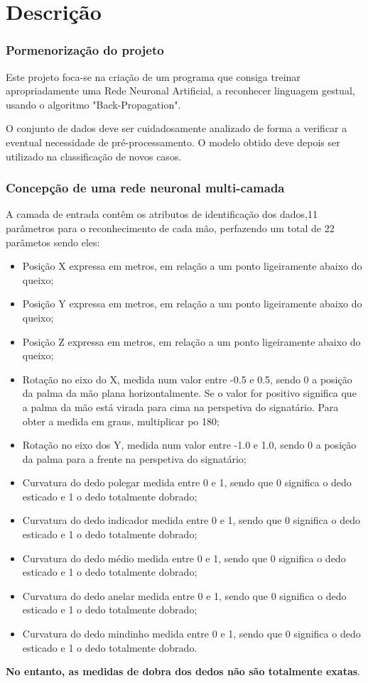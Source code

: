 \documentclass[10pt,a4paper]{article}
\begin{document}
\section{Descrição}

\subsubsection{Pormenorização do projeto}
Este projeto foca-se na criação de um programa que consiga treinar apropriadamente uma Rede Neuronal Artificial, a reconhecer linguagem gestual, usando o algoritmo "Back-Propagation". 

O conjunto de dados deve ser cuidadosamente analizado de forma a verificar a eventual necessidade de pré-processamento. O modelo obtido deve depois ser utilizado na classificação de novos casos. 

\subsubsection{Concepção de uma rede neuronal multi-camada}
A camada de entrada contêm os atributos de identificação dos dados,11 parâmetros para o reconhecimento de cada mão, perfazendo um total de 22 parâmetos sendo eles:
\begin{itemize}
\item Posição X expressa em metros, em relação a um ponto ligeiramente abaixo do queixo;
\item Posição Y expressa em metros, em relação a um ponto ligeiramente abaixo do queixo;
\item Posição Z expressa em metros, em relação a um ponto ligeiramente abaixo do queixo;
\item Rotação no eixo do X, medida num valor entre -0.5 e 0.5, sendo 0 a posição da palma da mão plana horizontalmente. Se o valor for positivo significa que a palma da mão está virada para cima na perspetiva do signatário. Para obter a medida em graus, multiplicar po 180;
\item Rotação no eixo dos Y, medida num valor entre -1.0 e 1.0, sendo 0 a posição da palma para a frente na perspetiva do signatário;
\item Curvatura do dedo polegar medida entre 0 e 1, sendo que 0 significa o dedo esticado e 1 o dedo totalmente dobrado;
\item Curvatura do dedo indicador medida entre 0 e 1, sendo que 0 significa o dedo esticado e 1 o dedo totalmente dobrado;
\item Curvatura do dedo médio medida entre 0 e 1, sendo que 0 significa o dedo esticado e 1 o dedo totalmente dobrado;
\item Curvatura do dedo anelar medida entre 0 e 1, sendo que 0 significa o dedo esticado e 1 o dedo totalmente dobrado;
\item Curvatura do dedo mindinho medida entre 0 e 1, sendo que 0 significa o dedo esticado e 1 o dedo totalmente dobrado.
\end{itemize}
\textbf{No entanto, as medidas de dobra dos dedos não são totalmente exatas}.
\end{document}
